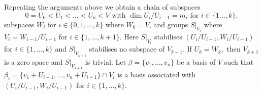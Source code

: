  Repeating the arguments above we obtain a chain of subspaces 
\begin{equation}
\label{GRUs}
 0=U_0<U_1< \ldots < U_k<V \text { with } \dim U_i/U_{i-1} =m_i \text{ for } i \in\{1 \ldots, k\},
\end{equation} 
 subspaces $W_i$  for $i \in \{0, 1, \ldots, k\}$ where $W_0=V$, and groups $S|_{V_i}$ where $V_i=W_{i-1}/U_{i-1}$ for $i \in \{1, \ldots, k+1\}.$ Here $S|_{V_{i}}$ stabilises $(U_{i}/U_{i-1}, W_{i}/U_{i-1})$ for $i\in \{1, \ldots, k\}$ and $S|_{V_{k+1}}$ stabilises no subspace of $V_{k+1}.$ If $U_k=W_k,$ then $V_{k+1}$ is a zero space and  $S|_{V_{k+1}}$ is trivial.  Let $\beta=\{v_1, \ldots, v_n\}$ be a basis of $V$ such that  $\beta_i=\{v_1 +U_{i-1}, \ldots, v_n +U_{i-1}\} \cap V_i$ is a basis associated with $(U_{i}/U_{i-1}, W_{i}/U_{i-1})$ for $i\in \{1, \ldots, k\}.$

